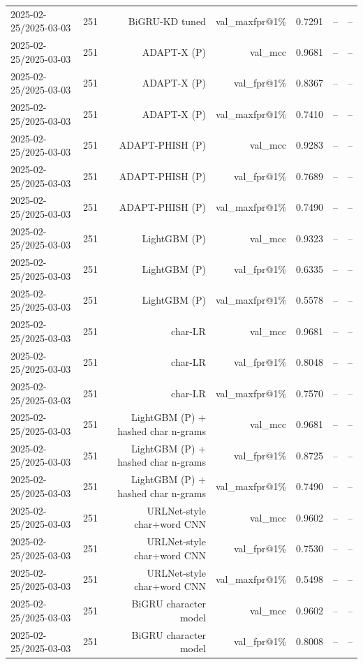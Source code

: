 \begin{table}[t]
\begin{tabular}{llrrrrr}
2025-02-25/2025-03-03 & 251 & BiGRU-KD tuned & val\_maxfpr@1\% & 0.7291 & -- & -- \\
2025-02-25/2025-03-03 & 251 & ADAPT-X (P) & val\_mcc & 0.9681 & -- & -- \\
2025-02-25/2025-03-03 & 251 & ADAPT-X (P) & val\_fpr@1\% & 0.8367 & -- & -- \\
2025-02-25/2025-03-03 & 251 & ADAPT-X (P) & val\_maxfpr@1\% & 0.7410 & -- & -- \\
2025-02-25/2025-03-03 & 251 & ADAPT-PHISH (P) & val\_mcc & 0.9283 & -- & -- \\
2025-02-25/2025-03-03 & 251 & ADAPT-PHISH (P) & val\_fpr@1\% & 0.7689 & -- & -- \\
2025-02-25/2025-03-03 & 251 & ADAPT-PHISH (P) & val\_maxfpr@1\% & 0.7490 & -- & -- \\
2025-02-25/2025-03-03 & 251 & LightGBM (P) & val\_mcc & 0.9323 & -- & -- \\
2025-02-25/2025-03-03 & 251 & LightGBM (P) & val\_fpr@1\% & 0.6335 & -- & -- \\
2025-02-25/2025-03-03 & 251 & LightGBM (P) & val\_maxfpr@1\% & 0.5578 & -- & -- \\
2025-02-25/2025-03-03 & 251 & char-LR & val\_mcc & 0.9681 & -- & -- \\
2025-02-25/2025-03-03 & 251 & char-LR & val\_fpr@1\% & 0.8048 & -- & -- \\
2025-02-25/2025-03-03 & 251 & char-LR & val\_maxfpr@1\% & 0.7570 & -- & -- \\
2025-02-25/2025-03-03 & 251 & LightGBM (P) + hashed char n-grams & val\_mcc & 0.9681 & -- & -- \\
2025-02-25/2025-03-03 & 251 & LightGBM (P) + hashed char n-grams & val\_fpr@1\% & 0.8725 & -- & -- \\
2025-02-25/2025-03-03 & 251 & LightGBM (P) + hashed char n-grams & val\_maxfpr@1\% & 0.7490 & -- & -- \\
2025-02-25/2025-03-03 & 251 & URLNet-style char+word CNN & val\_mcc & 0.9602 & -- & -- \\
2025-02-25/2025-03-03 & 251 & URLNet-style char+word CNN & val\_fpr@1\% & 0.7530 & -- & -- \\
2025-02-25/2025-03-03 & 251 & URLNet-style char+word CNN & val\_maxfpr@1\% & 0.5498 & -- & -- \\
2025-02-25/2025-03-03 & 251 & BiGRU character model & val\_mcc & 0.9602 & -- & -- \\
2025-02-25/2025-03-03 & 251 & BiGRU character model & val\_fpr@1\% & 0.8008 & -- & -- \\

\end{tabular}
\end{table}
